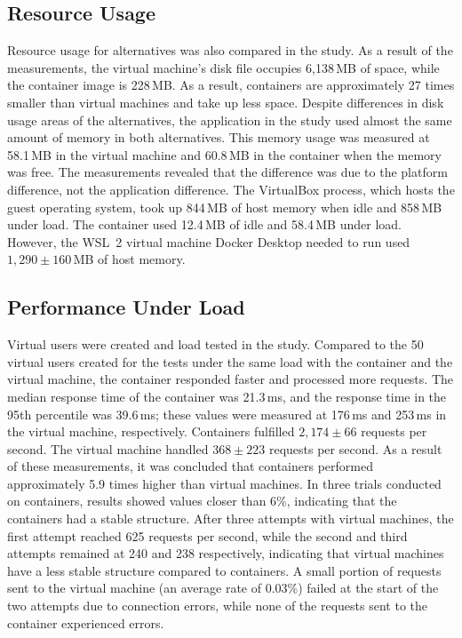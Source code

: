 \documentclass[conference,a4paper]{IEEEtran}
\begin{document}
\subsection{Resource Usage}
Resource usage for alternatives was also compared in the study. As a result of the measurements, the virtual machine's disk file occupies 6,138\,MB of space, while the container image is 228\,MB. As a result, containers are approximately 27 times smaller than virtual machines and take up less space. Despite differences in disk usage areas of the alternatives, the application in the study used almost the same amount of memory in both alternatives. This memory usage was measured at 58.1\,MB in the virtual machine and 60.8\,MB in the container when the memory was free. The measurements revealed that the difference was due to the platform difference, not the application difference. The VirtualBox process, which hosts the guest operating system, took up 844\,MB of host memory when idle and 858\,MB under load. The container used 12.4\,MB of idle and 58.4\,MB under load. However, the WSL~2 virtual machine Docker Desktop needed to run used $1{,}290 \pm 160$\,MB of host memory.

\subsection{Performance Under Load}
Virtual users were created and load tested in the study. Compared to the 50 virtual users created for the tests under the same load with the container and the virtual machine, the container responded faster and processed more requests. The median response time of the container was 21.3\,ms, and the response time in the 95th percentile was 39.6\,ms; these values were measured at 176\,ms and 253\,ms in the virtual machine, respectively. Containers fulfilled $2{,}174 \pm 66$ requests per second. The virtual machine handled $368 \pm 223$ requests per second. As a result of these measurements, it was concluded that containers performed approximately 5.9 times higher than virtual machines. In three trials conducted on containers, results showed values closer than 6\%, indicating that the containers had a stable structure. After three attempts with virtual machines, the first attempt reached 625 requests per second, while the second and third attempts remained at 240 and 238 respectively, indicating that virtual machines have a less stable structure compared to containers. A small portion of requests sent to the virtual machine (an average rate of 0.03\%) failed at the start of the two attempts due to connection errors, while none of the requests sent to the container experienced errors.
\end{document}
